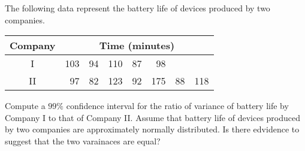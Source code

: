 \documentclass[letterpaper,10pt,addpoints]{exam}
\begin{document}
\begin{questions}

\question[15]
The following data represent the battery life of devices produced by two companies.

\begin{tabular}{c|rrrrrrr} 
Company & \multicolumn{7}{|c}{ Time (minutes) } \\
\hline I & 103 & 94 & 110 & 87 & 98 & \\
II & 97 & 82 & 123 & 92 & 175 & 88 & 118
\end{tabular}

Compute a $99 \%$ confidence interval for the ratio of variance of battery life by Company I to that of Company II. Assume that battery life of devices produced by two companies are approximately normally distributed. Is there edvidence to suggest that the two varainaces are equal?


\end{questions}
\end{document}
